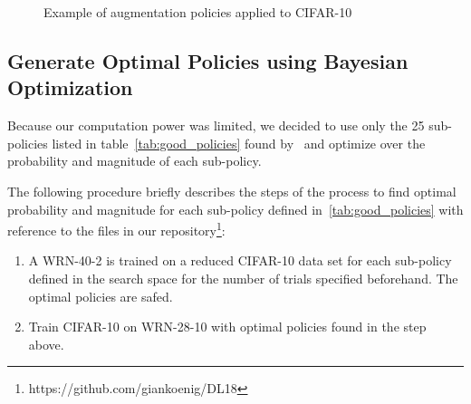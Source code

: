 \documentclass[10pt,twocolumn,letterpaper]{article}
\begin{document}
\begin{figure}
	\centering
	\caption{Example of augmentation policies applied to CIFAR-10}
	\label{fig:PolicyExample}
\end{figure}


\subsection{Generate Optimal Policies using Bayesian Optimization}
Because our computation power was limited, we decided to use only the 25 sub-policies listed in table~\ref{tab:good_policies} found by~\cite{Ekin} and optimize over the probability and magnitude of each sub-policy.

The following procedure briefly describes the steps of the process to find optimal probability and magnitude for each sub-policy defined in~\ref{tab:good_policies} with reference to the files in our repository\footnote{https://github.com/giankoenig/DL18}:

\begin{enumerate}
\item A WRN-40-2 is trained on a reduced CIFAR-10 data set for each sub-policy defined in the search space for the number of trials specified beforehand. The optimal policies are safed.
\item Train CIFAR-10 on WRN-28-10 with optimal policies found in the step above.
\end{enumerate}
\end{document}
